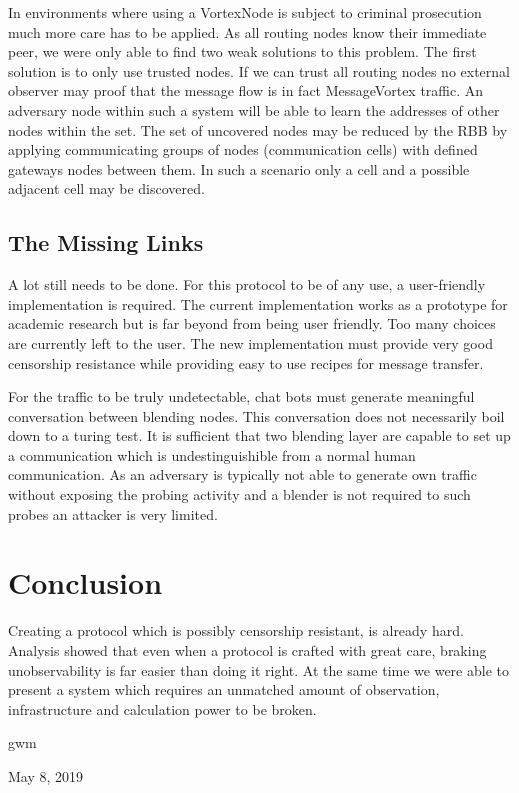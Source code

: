 \documentclass[10pt,journal,compsoc]{IEEEtran}
\begin{document}
In environments where using a VortexNode is subject to criminal prosecution much more care has to be applied. As all routing nodes know their immediate peer, we were only able to find two weak solutions to this problem. The first solution is to only use trusted nodes. If we can trust all routing nodes no external observer may proof that the message flow is in fact MessageVortex traffic. An adversary node within such a system will be able to learn the addresses of other nodes within the set. The set of uncovered nodes may be reduced by the RBB by applying communicating groups of nodes (communication cells) with defined gateways nodes between them. In such a scenario only a cell and a possible adjacent cell may be discovered.


\subsection{The Missing Links}
A lot still needs to be done. For this protocol to be of any use, a user-friendly implementation is required. The current implementation works as a prototype for academic research but is far beyond from being user friendly. Too many choices are currently left to the user. The new implementation must provide very good censorship resistance while providing easy to use recipes for message transfer. 

For the traffic to be truly undetectable, chat bots must generate meaningful conversation between blending nodes. This conversation does not necessarily boil down to a turing test. It is sufficient that two blending layer are capable to set up a communication which is undestinguishible from a normal human communication. As an adversary is typically not able to generate own traffic without exposing the probing activity and a blender is not required to such probes an attacker is very limited.

\section{Conclusion}
Creating a protocol which is possibly censorship resistant, is already hard. Analysis showed that even when a protocol is crafted with great care, braking unobservability is far easier than doing it right. At the same time we were able to present a system which requires an unmatched amount of observation, infrastructure and calculation power to be broken.

\hfill gwm
 
\hfill May 8, 2019
\end{document}
